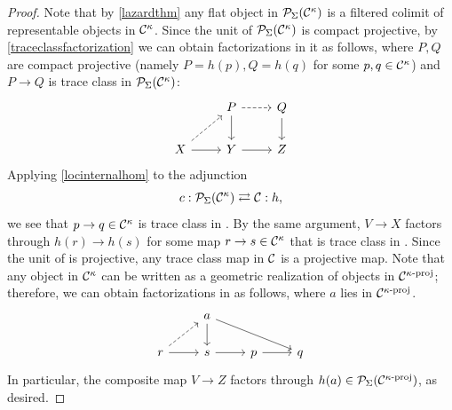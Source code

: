 \documentclass[a4paper,10pt, oneside]{amsart}
\begin{document}
\begin{proof}
		Note that by \cref{lazardthm} any flat object in $\mathcal{P}_{\Sigma}(\mathcal{C}^\kappa)$ is a  filtered colimit of representable objects in $\mathcal{C}^\kappa$. Since the unit of $\mathcal{P}_{\Sigma}(\mathcal{C}^{\kappa})$ is compact projective, by \cref{traceclassfactorization} we can obtain  factorizations in it as follows, where $P,Q$ are compact projective (namely $P=h(p),Q=h(q)$ for some $p,q\in \mathcal{C}^{\kappa}$) and $P\to Q$ is trace class in $\mathcal{P}_{\Sigma}(\mathcal{C}^{\kappa})$:
		$$\begin{tikzcd}
			& P \arrow[d] \arrow[r, dashed] & Q \arrow[d] \\
			X \arrow[r] \arrow[ru, dashed] & Y \arrow[r]                   & Z          
		\end{tikzcd}$$
		Applying \cref{locinternalhom} to the adjunction $$c: \mathcal{P}_{\Sigma}(\mathcal{C}^\kappa)\rightleftarrows \mathcal{C}: h,$$ %
		we see that $p\to q\in \mathcal{C}^{\kappa}$ is trace class in \mcc.
		By the same argument, $V\to X$ factors through $h(r)\to h(s)$ for some map $r\to s \in \mathcal{C}^{\kappa}$ that is trace class in \mcc.  Since the unit of \mcc is projective, any trace class map in $\mathcal{C}$ is a projective map. Note that any object in $\mathcal{C}^{\kappa}$ can be written as a geometric realization of objects in $\mathcal{C}^{\kappa\text{-}\mathrm{proj}}$; therefore, we  can obtain  factorizations in \mcc as follows, where $a$ lies in $\mathcal{C}^{\kappa\text{-}\mathrm{proj}}$.
		$$\begin{tikzcd}
			& a \arrow[d] \arrow[rrd] &             &   \\
			r \arrow[r] \arrow[ru, dashed] & s \arrow[r]                     & p \arrow[r] & q
		\end{tikzcd}$$
		In particular, the composite map $V\to Z$ factors through $h(a)\in\mathcal{P}_{\Sigma}(\mathcal{C}^{\kappa\text{-}\mathrm{proj}})$, as desired.
	\end{proof}
	
\end{document}
